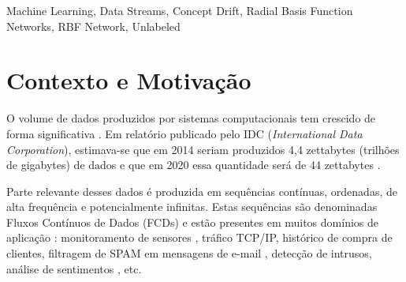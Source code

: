\documentclass[qual, classic, a4paper]{ufbathesis}
\begin{document}
\abstract

\blindtext

\begin{keywords}
    Machine Learning, Data Streams, Concept Drift, Radial Basis Function Networks, RBF Network, Unlabeled
\end{keywords}


\tableofcontents

\listoffigures

\listoftables

\mainmatter

% 
% 
% 
%

 \label{introducao}

\section{Contexto e Motivação}

O volume de dados produzidos por sistemas computacionais tem crescido de forma significativa \cite{Cohen:BigData:2009:MSN:1687553.1687576}.
Em relatório publicado pelo IDC (\textit{International Data Corporation}), 
estimava-se que em 2014 seriam produzidos 4,4 zettabytes (trilhões de gigabytes) de dados 
e que em 2020 essa quantidade será de 44 zettabytes \cite{idc_report}.

Parte relevante desses dados é produzida em sequências contínuas, ordenadas, de alta frequência e potencialmente infinitas.
Estas sequências são denominadas Fluxos Contínuos de Dados (FCDs) e estão presentes em muitos domínios de aplicação \cite{Aggarwal:2006:DSM:1196418}: 
monitoramento de sensores \cite{Lee:Wang:Ryu:2007},
tráfico TCP/IP, 
histórico de compra de clientes,
filtragem de SPAM em mensagens de e-mail \cite{Katakis:2010:TRC:1746286.1746291},
detecção de intrusos,
análise de sentimentos \cite{Smailovic:2014:SAL:2941772.2941857}, 
etc.
\end{document}
